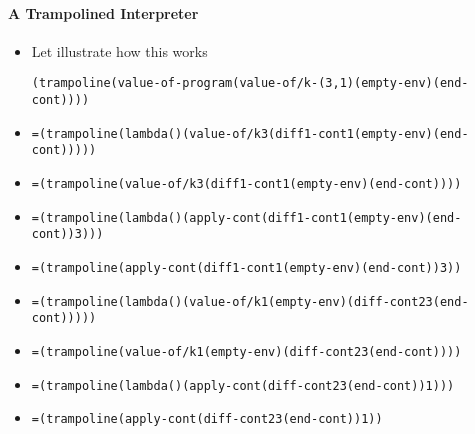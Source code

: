 \documentclass{beamer}
\begin{document}
\begin{frame}[fragile]
\framesubtitle{A Trampolined Interpreter}
\begin{tiny}
\begin{itemize}
\item<1-> Let illustrate how this works
\begin{alltt}
(trampoline (value-of-program (value-of/k -(3, 1) (empty-env) (end-cont))))
\end{alltt}

\item<2->
\begin{alltt}
= (trampoline (lambda () (value-of/k 3 (diff1-cont 1 (empty-env) (end-cont)))))
\end{alltt}

\item<3->
\begin{alltt}
= (trampoline (value-of/k 3 (diff1-cont 1 (empty-env) (end-cont))))
\end{alltt}

\item<4->
\begin{alltt}
= (trampoline (lambda () (apply-cont (diff1-cont 1 (empty-env) (end-cont)) 3)))
\end{alltt}

\item<5->
\begin{alltt}
= (trampoline (apply-cont (diff1-cont 1 (empty-env) (end-cont)) 3))
\end{alltt}

\item<6->
\begin{alltt}
= (trampoline (lambda () (value-of/k 1 (empty-env) (diff-cont2 3 (end-cont)))))
\end{alltt}

\item<7->
\begin{alltt}
= (trampoline (value-of/k 1 (empty-env) (diff-cont2 3 (end-cont))))
\end{alltt}

\item<8->
\begin{alltt}
= (trampoline (lambda () (apply-cont (diff-cont2 3 (end-cont)) 1)))
\end{alltt}

\item<9->
\begin{alltt}
= (trampoline (apply-cont (diff-cont2 3 (end-cont)) 1))
\end{alltt}


\end{itemize}
\end{tiny}
\end{frame}
\end{document}
